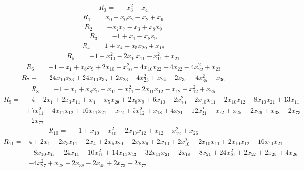 \begin{align*}
 R_{0}={}&-x_{3}^{2} +x_{4}
\end{align*}
\begin{align*}
 R_{1}={}&x_{0} -x_{0}x_{2} -x_{2} +x_{9}
\end{align*}
\begin{align*}
 R_{2}={}&-x_{2}x_{7} -x_{3} +x_{8}x_{9}
\end{align*}
\begin{align*}
 R_{3}={}&-1 +x_{1} -x_{8}x_{9}
\end{align*}
\begin{align*}
 R_{4}={}&1 +x_{4} -x_{5}x_{20} +x_{18}
\end{align*}
\begin{align*}
 R_{5}={}&-1 -x_{10}^{2} -2x_{10}x_{11} -x_{11}^{2} +x_{21}
\end{align*}
\begin{align*}
 R_{6}={}&-1 -x_{1} +x_{8}x_{9} +2x_{10} -x_{10}^{2} -4x_{10}x_{22} -4x_{22} -4x_{22}^{2} +x_{23}
\end{align*}
\begin{align*}
 R_{7}={}&-24x_{10}x_{23} +24x_{10}x_{35} +2x_{23} -4x_{23}^{2} +x_{24} -2x_{35} +4x_{35}^{2} -x_{36}
\end{align*}
\begin{align*}
 R_{8}={}&-1 -x_{1} +x_{8}x_{9} -x_{11} -x_{11}^{2} -2x_{11}x_{12} -x_{12} -x_{12}^{2} +x_{25}
\end{align*}
\begin{align*}
 R_{9}={}&-4 -2x_{1} +2x_{3}x_{11} +x_{4} -x_{5}x_{20} +2x_{8}x_{9} +6x_{10} -2x_{10}^{2} +2x_{10}x_{11} +2x_{10}x_{12} +8x_{10}x_{21} +13x_{11}\\
 &+7x_{11}^{2} -4x_{11}x_{12} +16x_{11}x_{21} -x_{12} +3x_{12}^{2} +x_{18} +4x_{21} -12x_{21}^{2} -x_{22} +x_{25} -2x_{26} +x_{38} -2x_{73}\\
 &-2x_{77}
\end{align*}
\begin{align*}
 R_{10}={}&-1 +x_{10} -x_{10}^{2} -2x_{10}x_{12} +x_{12} -x_{12}^{2} +x_{26}
\end{align*}
\begin{align*}
 R_{11}={}&4 +2x_{1} -2x_{3}x_{11} -2x_{4} +2x_{5}x_{20} -2x_{8}x_{9} +2x_{10} +2x_{10}^{2} -2x_{10}x_{11} +2x_{10}x_{12} -16x_{10}x_{21}\\
 &-8x_{10}x_{25} -24x_{11} -10x_{11}^{2} +14x_{11}x_{12} -32x_{11}x_{21} -2x_{18} -8x_{21} +24x_{21}^{2} +2x_{22} +2x_{25} +4x_{26}\\
 &-4x_{27}^{2} +x_{28} -2x_{38} -2x_{45} +2x_{73} +2x_{77}
\end{align*}
